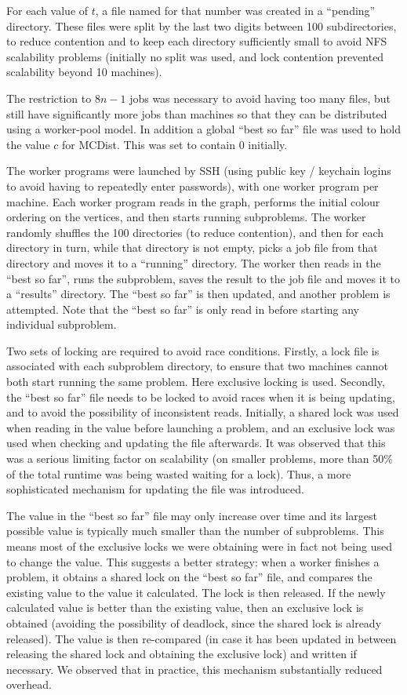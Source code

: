 \documentclass{l4proj}
\begin{document}
For each value of $t$, a file named for that number was created in a
``pending'' directory. These files were split by the last two digits between
100 subdirectories, to reduce contention and to keep each directory
sufficiently small to avoid NFS scalability problems (initially no split was
used, and lock contention prevented scalability beyond 10 machines).

The restriction to $8n-1$ jobs was necessary to avoid having too many files, but still have 
significantly more jobs than machines so that they can be distributed using a worker-pool model.
In addition a global ``best so far'' file was used to hold the value $c$ for MCDist. This
was set to contain $0$ initially.

The worker programs were launched by SSH (using public key / keychain logins to
avoid having to repeatedly enter passwords), with one worker program per
machine.  Each worker program reads in the graph, performs the initial colour
ordering on the vertices, and then starts running subproblems. The worker
randomly shuffles the 100 directories (to reduce contention), and then for each
directory in turn, while that directory is not empty, picks a job file from
that directory and moves it to a ``running'' directory. The worker then reads
in the ``best so far'', runs the subproblem, saves the result to the job file
and moves it to a ``results'' directory. The ``best so far'' is then updated,
and another problem is attempted.
Note that the ``best so far'' is only read in before starting any individual
subproblem.

Two sets of locking are required to avoid race conditions. Firstly, a lock file
is associated with each subproblem directory, to ensure that two machines
cannot both start running the same problem. Here exclusive locking is used.
Secondly, the ``best so far'' file needs to be locked to avoid races when it is
being updating, and to avoid the possibility of inconsistent reads. Initially,
a shared lock was used when reading in the value before launching a problem,
and an exclusive lock was used when checking and updating the file afterwards.
It was observed that this was a serious limiting factor on scalability (on
smaller problems, more than 50\% of the total runtime was being wasted waiting
for a lock). Thus, a more sophisticated mechanism for updating the file was
introduced.

The value in the ``best so far'' file may only increase over
time and its largest possible value is typically much smaller than the
number of subproblems. This means most of the exclusive locks we were obtaining
were in fact not being used to change the value. This suggests a better
strategy: when a worker finishes a problem, it obtains a shared lock on the
``best so far'' file, and compares the existing value to the value it
calculated. The lock is then released. If the newly calculated value is better
than the existing value, then an exclusive lock is obtained (avoiding the
possibility of deadlock, since the shared lock is already released). The value
is then re-compared (in case it has been updated in between releasing the shared
lock and obtaining the exclusive lock) and written if necessary.
We observed that in practice, this mechanism substantially reduced overhead.
\end{document}
